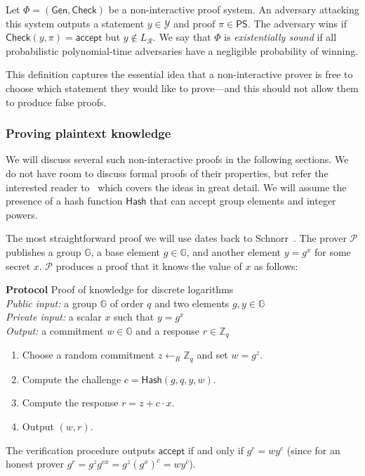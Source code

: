 \documentclass[12pt,a4paper]{article}
\makeatletter
\theoremstyle{definition}
\newcounter{protocol}
\newenvironment{protocol}[1]
  {\par\addvspace{\topsep}
   \noindent
   \tabularx{\linewidth}{@{} X @{}}
    \refstepcounter{protocol}\textbf{Protocol \theprotocol} #1 \\
    \hline}
  {
    \endtabularx
   }
\makeatother
\begin{document}
\begin{definition}
    Let $\Phi=(\mathsf{Gen}, \mathsf{Check})$ be a non-interactive proof system. An adversary attacking this system outputs a statement $y\in\mathcal{Y}$ and proof $\pi\in\mathsf{PS}$. The adversary wins if $\mathsf{Check}(y, \pi)=\mathsf{accept}$ but $y\notin L_\mathcal{R}$. We say that $\Phi$ is \textit{existentially sound} if all probabilistic polynomial-time adversaries have a negligible probability of winning.
\end{definition}
This definition captures the essential idea that a non-interactive prover is free to choose which statement they would like to prove---and this should not allow them to produce false proofs.

\subsubsection{Proving plaintext knowledge}
We will discuss several such non-interactive proofs in the following sections. We do not have room to discuss formal proofs of their properties, but refer the interested reader to~\cite{boneh2020graduate} which covers the ideas in great detail. We will assume the presence of a hash function $\mathsf{Hash}$ that can accept group elements and integer powers.

The most straightforward proof we will use dates back to Schnorr~\cite{schnorr1991efficient}. The prover $\mathcal{P}$ publishes a group $\mathbb{G}$, a base element $g\in\mathbb{G}$, and another element $y = g^x$ for some secret $x$. $\mathcal{P}$ produces a proof that it knows the value of $x$ as follows:

\begin{protocol}{Proof of knowledge for discrete logarithms}\label{prot:ProofKnowDlog}
    \textit{Public input:} a group $\mathbb{G}$ of order $q$ and two elements $g, y\in\mathbb{G}$\\
    \textit{Private input:} a scalar $x$ such that $y = g^x$\\
    \textit{Output:} a commitment $w\in\mathbb{G}$ and a response $r\in\mathbb{Z}_q$
    \begin{enumerate}
        \item Choose a random commitment $z\leftarrow_R\mathbb{Z}_q$ and set $w = g^z$.
        \item Compute the challenge $c=\mathsf{Hash}(g, q, y, w)$.
        \item Compute the response $r=z+c\cdot x$.
        \item Output $(w, r)$.
    \end{enumerate}
\end{protocol}
The verification procedure outputs $\mathsf{accept}$ if and only if $g^r=wy^c$ (since for an honest prover $g^r=g^zg^{cx}=g^z(g^x)^c=wy^c$).
\end{document}
